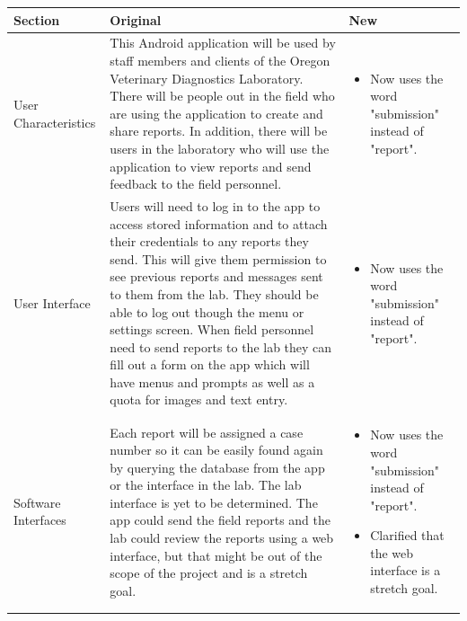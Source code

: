 \documentclass[onecolumn, draftclsnofoot,10pt, compsoc]{IEEEtran}
\begin{document}
\clearpage

\begin{table}
\begin{tabularx}{\textwidth}{|>{\setlength\hsize{.6\hsize}\setlength\linewidth{\hsize}}X|>{\setlength\hsize{1.6\hsize}\setlength\linewidth{\hsize}}X|>{\setlength\hsize{.8\hsize}\setlength\linewidth{\hsize}}X|}
\hline

\hline
Section & Original & New \\
\hline
User Characteristics
&
This Android application will be used by staff members and clients of the Oregon Veterinary Diagnostics Laboratory. 
There will be people out in the field who are using the application to create and share reports. 
In addition, there will be users in the laboratory who will use the application to view reports and send feedback to the field personnel.
&
\begin{itemize}
    \item Now uses the word "submission" instead of "report".
\end{itemize}\\

\hline

User Interface
&
Users will need to log in to the app to access stored information and to attach their credentials to any reports they send. 
This will give them permission to see previous reports and messages sent to them from the lab. They should be able to log out though the menu or settings screen. 
When field personnel need to send reports to the lab they can fill out a form on the app which will have menus and prompts as well as a quota for images and text entry.
&
\begin{itemize}
    \item Now uses the word "submission" instead of "report".
\end{itemize}\\

\hline

Software Interfaces
&
Each report will be assigned a case number so it can be easily found again by querying the database from the app or the interface in the lab. 
The lab interface is yet to be determined. 
The app could send the field reports and the lab could review the reports using  a web interface, but that might be out of the scope of the project and is a stretch goal. 
&
\begin{itemize}
    \item Now uses the word "submission" instead of "report".
    \item Clarified that the web interface is a stretch goal.
\end{itemize}\\


\end{tabularx}
\end{table}
\end{document}
